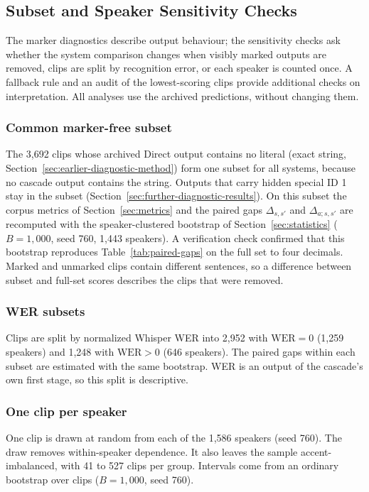 \subsection{Subset and Speaker Sensitivity Checks}
\label{sec:sensitivity-method}

The marker diagnostics describe output behaviour; the sensitivity checks ask
whether the system comparison changes when visibly marked outputs are removed,
clips are split by recognition error, or each speaker is counted once. A fallback
rule and an audit of the lowest-scoring clips provide additional checks on
interpretation. All analyses use the archived predictions, without changing them.

\subsubsection{Common marker-free subset}
The 3,692 clips whose archived Direct output contains no literal \unk{} (exact string, Section~\ref{sec:earlier-diagnostic-method}) form one subset for all systems, because no cascade output contains the string. Outputs that carry hidden special ID 1 stay in the subset (Section~\ref{sec:further-diagnostic-results}). On this subset the corpus metrics of Section~\ref{sec:metrics} and the paired gaps $\Delta_{s,s'}$ and $\Delta_{a;s,s'}$ are recomputed with the speaker-clustered bootstrap of Section~\ref{sec:statistics} ($B=1{,}000$, seed 760, 1,443 speakers). A verification check confirmed that this bootstrap reproduces Table~\ref{tab:paired-gaps} on the full set to four decimals. Marked and unmarked clips contain different sentences, so a difference between subset and full-set scores describes the clips that were removed.

\subsubsection{WER subsets}
Clips are split by normalized Whisper WER into 2,952 with $\mathrm{WER}=0$ (1,259 speakers) and 1,248 with $\mathrm{WER}>0$ (646 speakers). The paired gaps within each subset are estimated with the same bootstrap. WER is an output of the cascade's own first stage, so this split is descriptive.

\subsubsection{One clip per speaker}
One clip is drawn at random from each of the 1,586 speakers (seed 760). The draw removes within-speaker dependence. It also leaves the sample accent-imbalanced, with 41 to 527 clips per group. Intervals come from an ordinary bootstrap over clips ($B=1{,}000$, seed 760).

